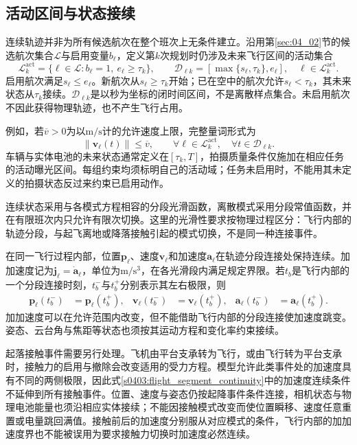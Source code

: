 \subsection{活动区间与状态接续}

连续轨迹并非为所有候选航次在整个班次上无条件建立。沿用第\ref{sec:04_02}节的候选航次集合$\mathcal L$与启用变量$b_\ell$，定义第$k$次规划时仍涉及未来飞行区间的活动集合
\begin{equation}
 \mathcal L_k^{\mathrm{act}}
 =\{\ell\in\mathcal L:b_\ell=1,\ e_\ell\ge\tau_k\},
 \qquad
 \mathcal D_{\ell k}
 =[\max\{s_\ell,\tau_k\},e_\ell],
 \quad \ell\in\mathcal L_k^{\mathrm{act}}.
 \label{s0403:active_domains}
\end{equation}
启用航次满足$s_\ell\le e_\ell$。新航次从$s_\ell\ge\tau_k$开始；已在空中的航次允许$s_\ell<\tau_k$，其未来状态从$\tau_k$接续。$\mathcal D_{\ell k}$是以秒为坐标的闭时间区间，不是离散样点集合。未启用航次不因此获得物理轨迹，也不产生飞行占用。

例如，若$\overline v>0$为以$\mathrm{m/s}$计的允许速度上限，完整量词形式为
\begin{equation}
 \|\mathbf v_\ell(t)\|\le\overline v,
 \qquad
 \forall\ell\in\mathcal L_k^{\mathrm{act}},\quad
 \forall t\in\mathcal D_{\ell k}.
 \label{s0403:continuous_quantifier}
\end{equation}
车辆与实体电池的未来状态通常定义在$[\tau_k,T]$，拍摄质量条件仅施加在相应任务的活动曝光区间。每组约束均须标明自己的活动域；任务未启用时，不能用其未定义的拍摄状态反过来约束已启用动作。

连续状态采用与各模式方程相容的分段光滑函数，离散模式采用分段常值函数，并在有限班次内只允许有限次切换。这里的光滑性要求按物理过程区分：飞行内部的轨迹分段，与起飞离地或降落接触引起的模式切换，不是同一种连接事件。

在同一飞行过程内部，位置$\mathbf p_\ell$、速度$\mathbf v_\ell$和加速度$\mathbf a_\ell$在轨迹分段连接处保持连续。加加速度记为$\mathbf j_\ell=\dot{\mathbf a}_\ell$，单位为$\mathrm{m/s^3}$，在各光滑段内满足规定界限。若$t_b$是飞行内部的一个分段连接时刻，$t_b^-$与$t_b^+$分别表示其左右极限，则
\begin{align}
 \mathbf p_\ell(t_b^-)&=\mathbf p_\ell(t_b^+),
 &\mathbf v_\ell(t_b^-)&=\mathbf v_\ell(t_b^+),
 &\mathbf a_\ell(t_b^-)&=\mathbf a_\ell(t_b^+).
 \label{s0403:flight_segment_continuity}
\end{align}
加加速度可以在允许范围内改变，但不能借助飞行内部的分段连接使加速度跳变。姿态、云台角与焦距等状态也须按其运动方程和变化率约束接续。

起落接触事件需要另行处理。飞机由平台支承转为飞行，或由飞行转为平台支承时，接触力的启用与撤除会改变适用的受力方程。模型允许此类事件处的加速度具有不同的两侧极限，因此式\eqref{s0403:flight_segment_continuity}中的加速度连续条件不延伸到所有接触事件。位置、速度与姿态仍按起降事件条件连接，相机状态与物理电池能量也须沿相应实体接续；不能因接触模式改变而使位置瞬移、速度任意重置或电量跳回满值。接触前后的加速度分别服从对应模式的条件，飞行内部的加加速度界也不能被误用为要求接触力切换时加速度必然连续。

